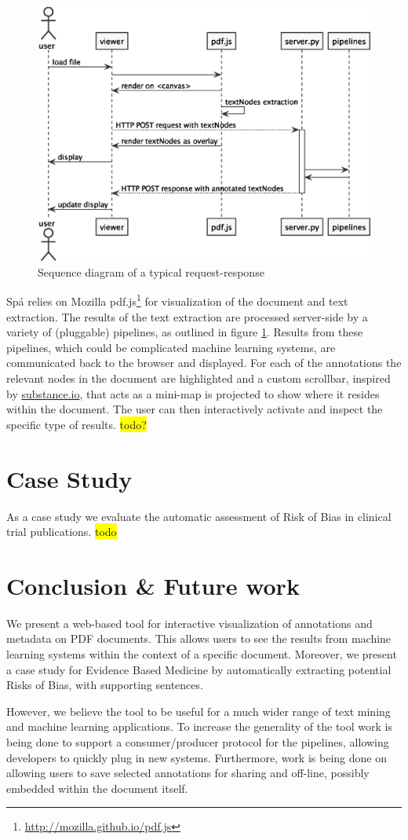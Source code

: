 \documentclass[runningheads,a4paper]{llncs}
\newcommand{\highlight}[1]{\colorbox{yellow}{#1}}
\begin{document}
\begin{figure}[htb]
\centering
\includegraphics[width=.9\linewidth]{sequence_diagram.eps}
\caption{\label{fig:sequence}Sequence diagram of a typical request-response}
\end{figure}

Sp{\'a} relies on Mozilla pdf.js\footnote{\url{http://mozilla.github.io/pdf.js}} for visualization of the document and text extraction.
The results of the text extraction are processed server-side by a variety of (pluggable) pipelines, as outlined in figure \ref{fig:sequence}.
Results from these pipelines, which could be complicated machine learning systems, are communicated back to the browser and displayed.
For each of the annotations the relevant nodes in the document are highlighted and a custom scrollbar, inspired by \href{http://substance.io/}{substance.io}, that acts as a mini-map is projected to show where it resides within the document.
The user can then interactively activate and inspect the specific type of results.
\highlight{todo?}
\section{Case Study}
\label{sec-3}
As a case study we evaluate the automatic assessment of Risk of Bias in clinical trial publications.
\highlight{todo}
\section{Conclusion \& Future work}
\label{sec-4}
We present a web-based tool for interactive visualization of annotations and metadata on PDF documents.
This allows users to see the results from machine learning systems within the context of a specific document.
Moreover, we present a case study for Evidence Based Medicine by automatically extracting potential Risks of Bias, with supporting sentences.

However, we believe the tool to be useful for a much wider range of text mining and machine learning applications.
To increase the generality of the tool work is being done to support a consumer/producer protocol for the pipelines, allowing developers to quickly plug in new systems.
Furthermore, work is being done on allowing users to save selected annotations for sharing and off-line, possibly embedded within the document itself.



\end{document}
